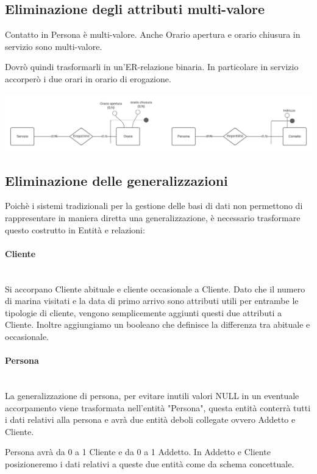 \subsection{Eliminazione degli attributi multi-valore}

Contatto in Persona è multi-valore. Anche Orario apertura e orario chiusura in servizio sono multi-valore.

Dovrò quindi trasformarli in un'ER-relazione binaria. In particolare in servizio accorperò i due orari in orario di erogazione.

\includegraphics[width=\linewidth]{img/multi_valore.png}

\subsection{Eliminazione delle generalizzazioni}

Poichè i sistemi tradizionali per la gestione delle basi di dati non permettono di rappresentare in maniera diretta una generalizzazione, è necessario trasformare questo costrutto in Entità e relazioni:

\paragraph{Cliente}\mbox{}\\
Si accorpano Cliente abituale e cliente occasionale a Cliente. Dato che il numero di marina visitati e la data di primo arrivo sono attributi utili per entrambe le tipologie di cliente, vengono semplicemente aggiunti questi due attributi a Cliente. Inoltre aggiungiamo un booleano che definisce la differenza tra abituale e occasionale.
\paragraph{Persona}\mbox{}\\
La generalizzazione di persona, per evitare inutili valori NULL in un eventuale accorpamento viene trasformata nell'entità "Persona", questa entità conterrà tutti i dati relativi alla persona e avrà due entità deboli collegate ovvero Addetto e Cliente.

Persona avrà da 0 a 1 Cliente e da 0 a 1 Addetto. In Addetto e Cliente posizioneremo i dati relativi a queste due entità come da schema concettuale.

